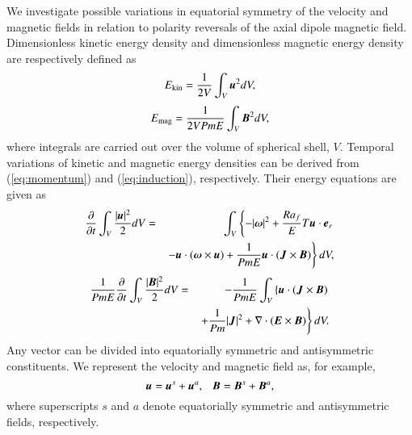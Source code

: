 {\color{red}
We investigate possible variations in equatorial symmetry of the velocity and magnetic fields in relation to polarity reversals of the axial dipole magnetic field.
}
Dimensionless kinetic energy density and dimensionless magnetic energy density are respectively defined as
%
\begin{equation}
E_{\rm kin} = \frac{1}{2 V}
  \int_V \mbox{\boldmath$u$}^2 d V ,
\label{eq:Ekin}
\end{equation}
%
\begin{equation}
E_{\rm mag} = \frac{1}{2 V Pm E}
  \int_V \mbox{\boldmath$B$}^2 d V ,
\label{eq:Emag}
\end{equation}
%
{\color{red}
where integrals are carried out over the volume of spherical shell, $V$.
}
Temporal variations of kinetic and magnetic energy densities can be derived from (\ref{eq:momentum}) and (\ref{eq:induction}), respectively.
Their energy equations are given as
%
\begin{eqnarray}
\frac{\partial}{\partial t}
 \int_V \frac{|\mbox{\boldmath$u$}|^2}{2} d V
 &=& \int_V \left\{
    - |\mbox{\boldmath$\omega$}|^2 
    + \frac{Ra_f}{E}T \mbox{\boldmath$u$}\cdot \mbox{\boldmath$e$}_r
      \right.
\nonumber \\
 & & \left.
    - \mbox{\boldmath$u$} \cdot (\mbox{\boldmath$\omega$}\times\mbox{\boldmath$u$})
    + \frac{1}{Pm E} \mbox{\boldmath$u$} \cdot
                     (\mbox{\boldmath$J$} \times \mbox{\boldmath$B$})
      \right\} d V,
\label{eq:energy_u}
\end{eqnarray}
%
\begin{eqnarray}
\frac{1}{Pm E}\frac{\partial}{\partial t}
 \int_V \frac{|\mbox{\boldmath$B$}|^2}{2} d V
  & = & 
- \frac{1}{Pm E}\int_V \left\{
      \mbox{\boldmath$u$} \cdot ( \mbox{\boldmath$J$} \times \mbox{\boldmath$B$} )
\right. \nonumber \\
 & &    \left.
    + \frac{1}{Pm} |\mbox{\boldmath$J$}|^2
    + \nabla \cdot ( \mbox{\boldmath$E$} \times \mbox{\boldmath$B$} ) 
      \right\} d V.
\label{eq:energy_B}
\end{eqnarray}
%
Any vector can be divided into equatorially symmetric and antisymmetric constituents.
We represent the velocity and magnetic field as, for example, 
%
\begin{equation}
\mbox{\boldmath$u$} = \mbox{\boldmath$u$}^s + \mbox{\boldmath$u$}^a, ~~~
\mbox{\boldmath$B$} = \mbox{\boldmath$B$}^s + \mbox{\boldmath$B$}^a,
\label{eq:eqas}
\end{equation}
%
where superscripts $s$ and $a$ denote equatorially symmetric and antisymmetric fields, respectively.
